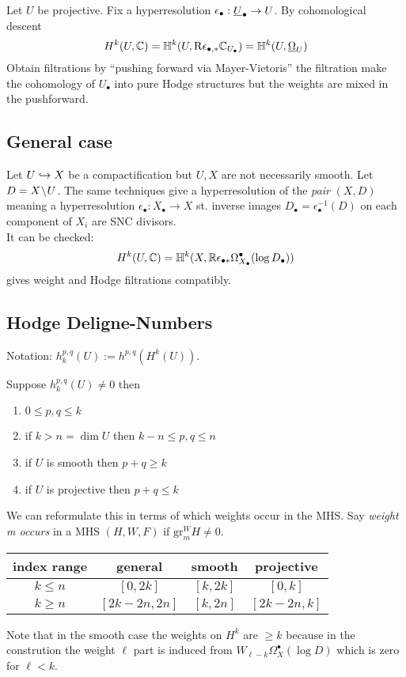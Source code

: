 \documentclass[12pt]{article}
\newcommand{\HH}{\mathbb{H}}
\renewcommand{\gr}{\mathrm{gr}}
\newcommand{\R}{\mathrm{R}}
\begin{document}
Let $U$ be projective. Fix a hyperresolution $\epsilon_\bullet : \underline{U}_\bullet \to U$. By cohomological descent
\[ H^k(U, \CC) = \HH^k(U, \R \epsilon_{\bullet, *} \CC_{U_\bullet}) = \HH^k(U, \ul{\Omega}_U) \]
Obtain filtrations by ``pushing forward via Mayer-Vietoris'' the filtration make the cohomology of $U_\bullet$ into pure Hodge structures but the weights are mixed in the pushforward.

\subsection{General case}

Let $U \hookrightarrow X$ be a compactification but $U, X$ are not necessarily smooth. Let $D = X \! \setminus \! U$. The same techniques give a hyperresolution of the \textit{pair} $(X,D)$ meaning a hyperresolution $\epsilon_{\bullet} : X_{\bullet} \to X$ st. inverse images $D_\bullet = \epsilon_\bullet^{-1}(D)$ on each component of $X_i$ are SNC divisors.
\bigskip\\
It can be checked: 
\[ H^k(U, \CC) = \HH^k(X, \RR \epsilon_{\bullet *} \Omega^\bullet_{X_{\bullet}}(\log{D_\bullet})) \]
gives weight and Hodge filtrations compatibly.  

\subsection{Hodge Deligne-Numbers}

Notation: $h^{p,q}_k(U) := h^{p,q}(H^k(U))$.

\begin{theorem}
Suppose $h^{p,q}_k(U) \neq 0$ then 
\begin{enumerate}
\item $0 \le p, q \le k$
\item if $k > n = \dim{U}$ then $k-n \le p,q \le n$
\item if $U$ is smooth then $p + q \ge k$
\item if $U$ is projective then $p + q \le k$
\end{enumerate}
\end{theorem}

We can reformulate this in terms of which weights occur in the MHS. Say \textit{weight m occurs} in a MHS $(H, W, F)$ if $\gr^W_m H \neq 0$. 
\begin{center}
\begin{tabular}{c|c|c|c}
index range & general & smooth & projective
\\
\hline
$k \le n$ & $[0, 2k]$ & $[k,2k]$ & $[0,k]$
\\
$k \ge n$ & $[2k - 2n, 2n]$ & $[k,2n]$ & $[2k-2n, k]$ 
\end{tabular}
\end{center}
Note that in the smooth case the weights on $H^k$ are $\ge k$ because in the constrution the weight $\ell$ part is induced from $W_{\ell - k} \Omega_X^\bullet(\log{D})$ which is zero for $\ell < k$.
\end{document}
